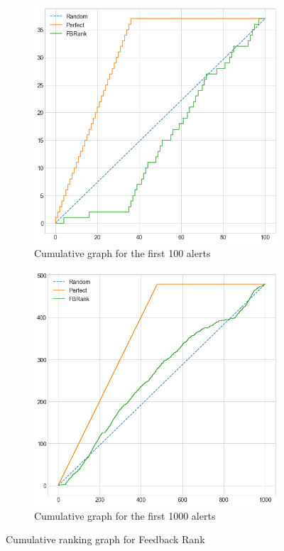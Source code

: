 \begin{figure}[H]
	\begin{subfigure}{.5\textwidth}
		\centering
		\includegraphics[scale=0.3]{./src/fbRank/fbrank_cumulative_graph_top100.png}
		\caption{Cumulative graph for the first 100 alerts}\label{}
	\end{subfigure}%
	\begin{subfigure}{.5\textwidth}
		\centering
		\includegraphics[scale=0.3]{./src/fbRank/fbrank_cumulative_graph_top1000.png}
		\caption{Cumulative graph for the first 1000 alerts}\label{}
	\end{subfigure}
	\caption{Cumulative ranking graph for Feedback Rank}
	\label{results:cumulative_fbrank}
\end{figure}


